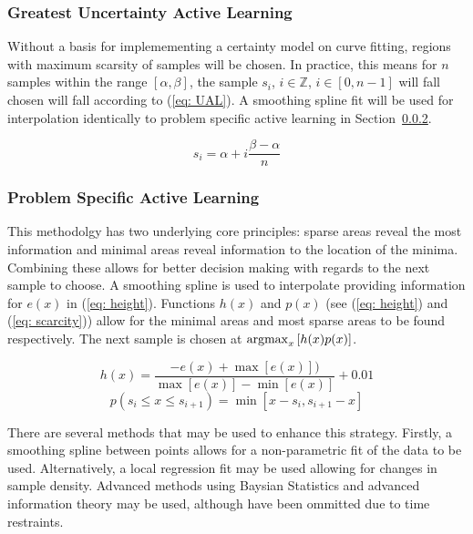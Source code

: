 \subsubsection{Greatest Uncertainty Active Learning}
Without a basis for implemementing a certainty model on curve fitting, regions with maximum scarsity of samples will be chosen. In practice, this means for $n$ samples within the range $[\alpha, \beta]$, the sample $s_i$, $i\in\mathbb{Z}$, $i\in[0, n-1]$ will fall chosen will fall according to (\ref{eq: UAL}). A smoothing spline fit will be used for interpolation identically to problem specific active learning in Section~\ref{sssec:Active Learning}.

\begin{equation}
  \label{eq: UAL}
  s_i=\alpha+i\frac{\beta-\alpha}{n}
\end{equation}

\subsubsection{Problem Specific Active Learning}
\label{sssec:Active Learning}
This methodolgy has two underlying core principles: sparse areas reveal the most information and minimal areas reveal information to the location of the minima. Combining these allows for better decision making with regards to the next sample to choose. A smoothing spline is used to interpolate providing information for $e(x)$ in (\ref{eq: height}). Functions $h(x)$ and $p(x)$ (see (\ref{eq: height}) and (\ref{eq: scarcity})) allow for the minimal areas and most sparse areas to be found respectively. The next sample is chosen at ${\operatorname*{argmax}_x{[h(x)p(x)]}}$.

\begin{equation}
  \label{eq: height}
  {h(x)=\frac{-e(x)+\max[e(x)])}{\max[e(x)]-\min[e(x)]}}+0.01
\end{equation}
\begin{equation}
  \label{eq: scarcity}
  p(s_i \le x \le s_{i+1})=\min[x-s_i, s_{i+1}-x]
\end{equation}

There are several methods that may be used to enhance this strategy. Firstly, a smoothing spline between points allows for a non-parametric fit of the data to be used. Alternatively, a local regression fit may be used allowing for changes in sample density. Advanced methods using Baysian Statistics and advanced information theory may be used, although have been ommitted due to time restraints.


